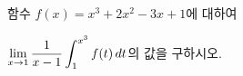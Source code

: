 함수 $f(x)=x^3+2x^2-3x+1$에 대하여\par\noindent $\displaystyle\lim_{x\to 1}\dfrac{1}{x-1}\int_{1}^{x^3}f(t)\mkern3mu dt$의 값을 구하시오.
